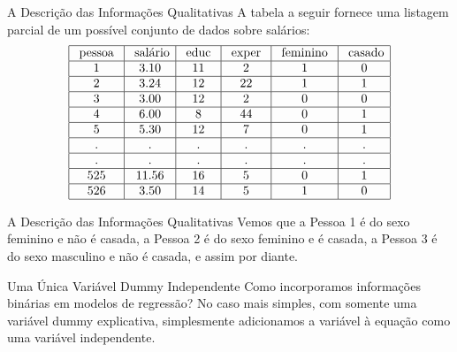 \documentclass[t,14pt,mathserif]{beamer}
\begin{document}
\begin{frame}{A Descrição das Informações Qualitativas}
        \justifying
		\vfill
        A tabela a seguir fornece uma listagem parcial de um possível conjunto de dados sobre salários:
		\vfill 
		\footnotesize
		\begin{equation}  
		\begin{array}{|c|c|c|c|c|c|c|}
		\hline \text { pessoa } & {\text { salário} } & {\text { educ }} & {\text { exper }} & {\text { feminino }} & {\text { casado}} \\
		\hline 1 & {3.10} & {11} & {2} & {1} & {0} \\
		\hline 2 & {3.24} & {12} & {22} & {1} & {1} \\
		\hline 3 & {3.00} & {12} & {2} & {0} & {0} \\
		\hline 4 & {6.00} & {8} & {44} & {0} & {1} \\
		\hline 5 & {5.30} & {12} & {7} & {0} & {1} \\
		\hline . & {.} & {.} & {.} & {.} & {.}  \\
		\hline . & {.} & {.} & {.} & {.} & {.}  \\
		\hline 525 & {11.56} & {16} & {5} & {0} & {1}  \\
		\hline 526 & {3.50} & {14} & {5} & {1} & {0} \\
		\hline
		\end{array}\nonumber
		\end{equation}
\end{frame}

\begin{frame}{A Descrição das Informações Qualitativas}
		\justifying
		\vfill 
		Vemos que a Pessoa 1 é do sexo feminino e não é casada, a Pessoa 2 é do sexo feminino e é casada, a Pessoa 3 é do sexo masculino e não é casada, e assim por diante.
		\vfill

\end{frame}


\begin{frame}{Uma Única Variável Dummy Independente}
		\justifying
		\vfill 
		Como incorporamos informações binárias em modelos de regressão? 
		\vfill
		No caso mais simples, com somente uma variável dummy explicativa, simplesmente adicionamos a variável à equação como uma variável independente.
		\vfill
       
        
\end{frame}
\end{document}

